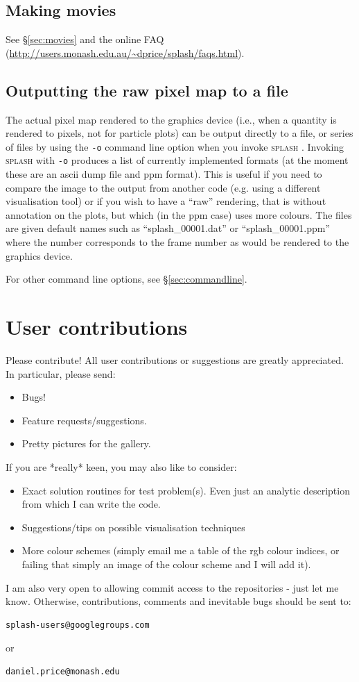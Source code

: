 \documentclass[a4paper,10pt]{article}
\newcommand{\splash}{\textsc{splash }}
\begin{document}
\subsection{Making movies}
See \S\ref{sec:movies} and the online FAQ (\url{http://users.monash.edu.au/~dprice/splash/faqs.html}).

\subsection{Outputting the raw pixel map to a file}
\label{sec:writepixmap}
 The actual pixel map rendered to the graphics device (i.e., when a quantity is rendered to pixels, not for particle plots) can be output directly to a file, or series of files by using the \verb+-o+ command line option when you invoke \splash. Invoking \splash with \verb+-o+ produces a list of currently implemented formats (at the moment these are an ascii dump file and ppm format). This is useful if you need to compare the image to the output from another code (e.g. using a different visualisation tool) or if you wish to have a ``raw'' rendering, that is without annotation on the plots, but which (in the ppm case) uses more colours. The files are given default names such as ``splash\_00001.dat'' or ``splash\_00001.ppm'' where the number corresponds to the frame number as would be rendered to the graphics device.
 
  For other command line options, see \S\ref{sec:commandline}.

\section{User contributions}%
 Please contribute! All user contributions or suggestions are greatly
appreciated. In particular, please send:
\begin{itemize}
\item Bugs!
\item Feature requests/suggestions.
\item Pretty pictures for the gallery.
\end{itemize}
If you are *really* keen, you may also like to consider:
\begin{itemize}
\item Exact solution routines for test problem(s). Even just an analytic description from which I can write the code.
\item Suggestions/tips on possible visualisation techniques
\item More colour schemes (simply email me a table of the rgb colour indices, or failing that simply an image of the colour scheme and I will add it).
\end{itemize}
I am also very open to allowing commit access to the repositories - just let me know. Otherwise, contributions, comments and inevitable bugs should be sent to:
\begin{verbatim}
splash-users@googlegroups.com
\end{verbatim}
or
\begin{verbatim}
daniel.price@monash.edu
\end{verbatim}
\end{document}
